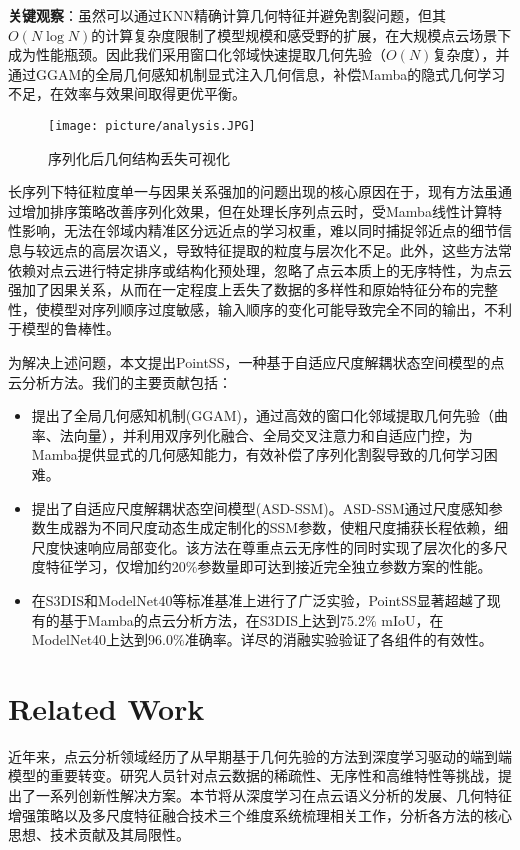 \documentclass[preprint,12pt]{elsarticle}
\begin{document}
\textbf{关键观察}：虽然可以通过KNN精确计算几何特征并避免割裂问题，但其$O(N\log N)$的计算复杂度限制了模型规模和感受野的扩展，在大规模点云场景下成为性能瓶颈。因此我们采用窗口化邻域快速提取几何先验（$O(N)$复杂度），并通过GGAM的全局几何感知机制显式注入几何信息，补偿Mamba的隐式几何学习不足，在效率与效果间取得更优平衡。

\begin{figure}[htbp]
	\centering
	\texttt{[image: picture/analysis.JPG]}
	\caption{序列化后几何结构丢失可视化}
	\label{fig:analysis}
\end{figure}

长序列下特征粒度单一与因果关系强加的问题出现的核心原因在于，现有方法虽通过增加排序策略改善序列化效果，但在处理长序列点云时，受Mamba线性计算特性影响，无法在邻域内精准区分远近点的学习权重，难以同时捕捉邻近点的细节信息与较远点的高层次语义，导致特征提取的粒度与层次化不足。此外，这些方法常依赖对点云进行特定排序或结构化预处理，忽略了点云本质上的无序特性，为点云强加了因果关系，从而在一定程度上丢失了数据的多样性和原始特征分布的完整性，使模型对序列顺序过度敏感，输入顺序的变化可能导致完全不同的输出，不利于模型的鲁棒性。

为解决上述问题，本文提出PointSS，一种基于自适应尺度解耦状态空间模型的点云分析方法。我们的主要贡献包括：

\begin{itemize}
	\item 提出了全局几何感知机制(GGAM)，通过高效的窗口化邻域提取几何先验（曲率、法向量），并利用双序列化融合、全局交叉注意力和自适应门控，为Mamba提供显式的几何感知能力，有效补偿了序列化割裂导致的几何学习困难。

	\item 提出了自适应尺度解耦状态空间模型(ASD-SSM)。ASD-SSM通过尺度感知参数生成器为不同尺度动态生成定制化的SSM参数，使粗尺度捕获长程依赖，细尺度快速响应局部变化。该方法在尊重点云无序性的同时实现了层次化的多尺度特征学习，仅增加约20\%参数量即可达到接近完全独立参数方案的性能。

	\item 在S3DIS和ModelNet40等标准基准上进行了广泛实验，PointSS显著超越了现有的基于Mamba的点云分析方法，在S3DIS上达到75.2\% mIoU，在ModelNet40上达到96.0\%准确率。详尽的消融实验验证了各组件的有效性。
\end{itemize}





\section{Related Work}
近年来，点云分析领域经历了从早期基于几何先验的方法到深度学习驱动的端到端模型的重要转变。研究人员针对点云数据的稀疏性、无序性和高维特性等挑战，提出了一系列创新性解决方案。本节将从深度学习在点云语义分析的发展、几何特征增强策略以及多尺度特征融合技术三个维度系统梳理相关工作，分析各方法的核心思想、技术贡献及其局限性。
\end{document}

